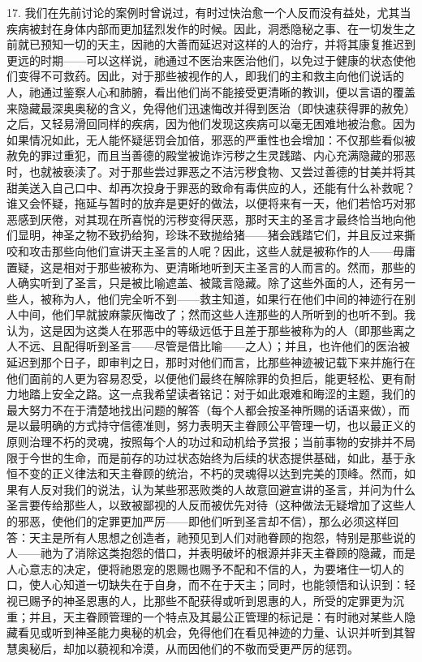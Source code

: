 17. 我们在先前讨论的案例时曾说过，有时过快治愈一个人反而没有益处，尤其当疾病被封在身体内部而更加猛烈发作的时候。因此，洞悉隐秘之事、在一切发生之前就已预知一切的天主，因祂的大善而延迟对这样的人的治疗，并将其康复推迟到更远的时期——可以这样说，祂通过不医治来医治他们，以免过于健康的状态使他们变得不可救药。因此，对于那些被视作的人，即我们的主和救主向他们说话的人，祂通过鉴察人心和肺腑，看出他们尚不能接受更清晰的教训，便以言语的覆盖来隐藏最深奥奥秘的含义，免得他们迅速悔改并得到医治（即快速获得罪的赦免）之后，又轻易滑回同样的疾病，因为他们发现这疾病可以毫无困难地被治愈。因为如果情况如此，无人能怀疑惩罚会加倍，邪恶的严重性也会增加：不仅那些看似被赦免的罪过重犯，而且当善德的殿堂被诡诈污秽之生灵践踏、内心充满隐藏的邪恶时，也就被亵渎了。对于那些尝过罪恶之不洁污秽食物、又尝过善德的甘美并将其甜美送入自己口中、却再次投身于罪恶的致命有毒供应的人，还能有什么补救呢？谁又会怀疑，拖延与暂时的放弃是更好的做法，以便将来有一天，他们若恰巧对邪恶感到厌倦，对其现在所喜悦的污秽变得厌恶，那时天主的圣言才最终恰当地向他们显明，神圣之物不致扔给狗，珍珠不致抛给猪——猪会践踏它们，并且反过来撕咬和攻击那些向他们宣讲天主圣言的人呢？因此，这些人就是被称作的人——毋庸置疑，这是相对于那些被称为、更清晰地听到天主圣言的人而言的。然而，那些的人确实听到了圣言，只是被比喻遮盖、被箴言隐藏。除了这些外面的人，还有另一些人，被称为人，他们完全听不到——救主知道，如果行在他们中间的神迹行在别人中间，他们早就披麻蒙灰悔改了；然而这些人连那些的人所听到的也听不到。我认为，这是因为这类人在邪恶中的等级远低于且差于那些被称为的人（即那些离之人不远、且配得听到圣言——尽管是借比喻——之人）；并且，也许他们的医治被延迟到那个日子，即审判之日，那时对他们而言，比那些神迹被记载下来并施行在他们面前的人更为容易忍受，以便他们最终在解除罪的负担后，能更轻松、更有耐力地踏上安全之路。这一点我希望读者铭记：对于如此艰难和晦涩的主题，我们的最大努力不在于清楚地找出问题的解答（每个人都会按圣神所赐的话语来做），而是以最明确的方式持守信德准则，努力表明天主眷顾公平管理一切，也以最正义的原则治理不朽的灵魂，按照每个人的功过和动机给予赏报；当前事物的安排并不局限于今世的生命，而是前存的功过状态始终为后续的状态提供基础，如此，基于永恒不变的正义律法和天主眷顾的统治，不朽的灵魂得以达到完美的顶峰。然而，如果有人反对我们的说法，认为某些邪恶败类的人故意回避宣讲的圣言，并问为什么圣言要传给那些人，以致被鄙视的人反而被优先对待（这种做法无疑增加了这些人的邪恶，使他们的定罪更加严厉——即他们听到圣言却不信），那么必须这样回答：天主是所有人思想之创造者，祂预见到人们对祂眷顾的抱怨，特别是那些说的人——祂为了消除这类抱怨的借口，并表明破坏的根源并非天主眷顾的隐藏，而是人心意志的决定，便将祂恩宠的恩赐也赐予不配和不信的人，为要堵住一切人的口，使人心知道一切缺失在于自身，而不在于天主；同时，也能领悟和认识到：轻视已赐予的神圣恩惠的人，比那些不配获得或听到恩惠的人，所受的定罪更为沉重；并且，天主眷顾管理的一个特点及其最公正管理的标记是：有时祂对某些人隐藏看见或听到神圣能力奥秘的机会，免得他们在看见神迹的力量、认识并听到其智慧奥秘后，却加以藐视和冷漠，从而因他们的不敬而受更严厉的惩罚。\par

